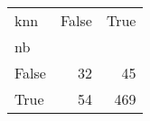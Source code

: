 \begin{tabular}{lrr}
\toprule
knn &  False &  True  \\
nb    &        &        \\
\midrule
False &     32 &     45 \\
True  &     54 &    469 \\
\bottomrule
\end{tabular}
